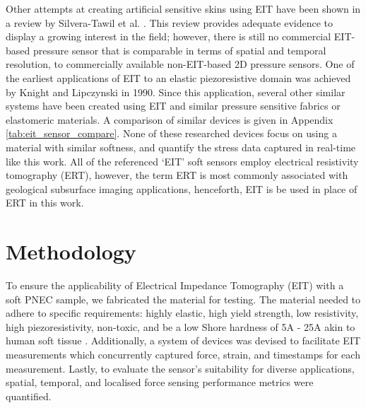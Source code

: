 Other attempts at creating artificial sensitive skins using EIT have been shown in a review by Silvera-Tawil et al. \cite{Silvera-Tawil2015}. This review provides adequate evidence to display a growing interest in the field; however, there is still no commercial EIT-based pressure sensor that is comparable in terms of spatial and temporal resolution, to commercially available non-EIT-based 2D pressure sensors.
One of the earliest applications of EIT to an elastic piezoresistive domain was achieved by Knight and Lipczynski \cite{Knight1990} in 1990. Since this application, several other similar systems have been created using EIT and similar pressure sensitive fabrics or elastomeric materials\cite{Nagakubo2007,Russo2017,Sun2020,Silvera-Tawil2015,Yoon2017,Kato2007,Biasi2022}. A comparison of similar devices is given in Appendix \ref{tab:eit_sensor_compare}. None of these researched devices focus on using a material with similar softness, and quantify the stress data captured in real-time like this work. All of the referenced `EIT' soft sensors employ electrical resistivity tomography (ERT), however, the term ERT is most commonly associated with geological subsurface imaging applications, henceforth, EIT is be used in place of ERT in this work.


\section{Methodology} \label{sec:Methodology}
To ensure the applicability of Electrical Impedance Tomography (EIT) with a soft PNEC sample, we fabricated the material for testing. The material needed to adhere to specific requirements: highly elastic,  high yield strength, low resistivity, high piezoresistivity, non-toxic, and be a low Shore hardness of 5A - 25A akin to human soft tissue \citep{Silvera-Tawil2015,Chatzistergos2022,McDermott2017,Landry2021}. Additionally, a system of devices was devised to facilitate EIT measurements which concurrently captured force, strain, and timestamps for each measurement. Lastly, to evaluate the sensor's suitability for diverse applications, spatial, temporal, and localised force sensing performance metrics were quantified.


